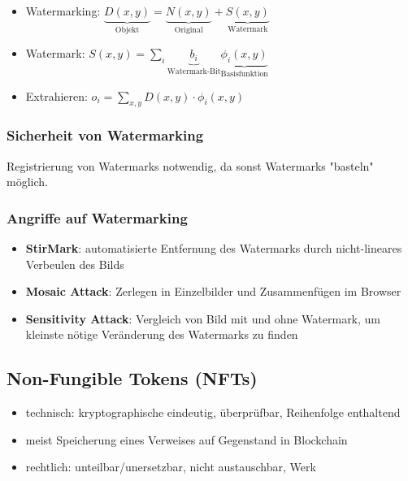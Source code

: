 \documentclass{article}
\begin{document}
\begin{itemize}
  \item Watermarking: $\underbrace{D(x,y)}_{\text{Objekt}} = \underbrace{N(x,y)}_{\text{Original}} + \underbrace{S(x,y)}_{\text{Watermark}}$
  \item Watermark: $S(x,y) = \sum_{i}{\underbrace{b_i}_{\text{Watermark-Bit}} \underbrace{\phi_i(x,y)}_{\text{Basisfunktion}}}$
  \item Extrahieren: $o_i = \sum_{x,y}{D(x,y) \cdot \phi_i(x,y)}$
\end{itemize}

\subsubsection{Sicherheit von Watermarking}
Registrierung von Watermarks notwendig, da sonst Watermarks "basteln" möglich.

\subsubsection{Angriffe auf Watermarking}
\begin{itemize}
  \item \textbf{StirMark}: automatisierte Entfernung des Watermarks durch nicht-lineares Verbeulen des Bilds
  \item \textbf{Mosaic Attack}: Zerlegen in Einzelbilder und Zusammenfügen im Browser
  \item \textbf{Sensitivity Attack}: Vergleich von Bild mit und ohne Watermark, um kleinste nötige Veränderung des Watermarks zu finden
\end{itemize}

\subsection{Non-Fungible Tokens (NFTs)}
\begin{itemize}
  \item technisch: kryptographische eindeutig, überprüfbar, Reihenfolge enthaltend
  \item meist Speicherung eines Verweises auf Gegenstand in Blockchain
  \item rechtlich: unteilbar/unersetzbar, nicht austauschbar, Werk
\end{itemize}
\end{document}
